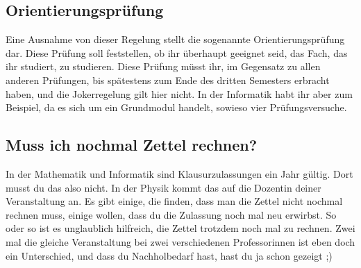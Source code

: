 \subsection{Orientierungsprüfung}
Eine Ausnahme von dieser Regelung stellt die sogenannte Orientierungsprüfung dar. Diese Prüfung soll feststellen, ob ihr überhaupt geeignet seid, das Fach, das ihr studiert, zu studieren. Diese Prüfung müsst ihr, im Gegensatz zu allen anderen Prüfungen, bis spätestens zum Ende des dritten Semesters erbracht haben, und die Jokerregelung gilt hier nicht. In der Informatik habt ihr aber zum Beispiel, da es sich um ein Grundmodul handelt, sowieso vier Prüfungsversuche.

\subsection{Muss ich nochmal Zettel rechnen?}
In der Mathematik und Informatik sind Klausurzulassungen ein Jahr gültig. Dort musst du das also nicht. In der Physik kommt das auf die Dozentin deiner Veranstaltung an. Es gibt einige, die finden, dass man die Zettel nicht nochmal rechnen muss, einige wollen, dass du die Zulassung noch mal neu erwirbst. So oder so ist es unglaublich hilfreich, die Zettel trotzdem noch mal zu rechnen. Zwei mal die gleiche Veranstaltung bei zwei verschiedenen Professorinnen ist eben doch ein Unterschied, und dass du Nachholbedarf hast, hast du ja schon gezeigt ;)
